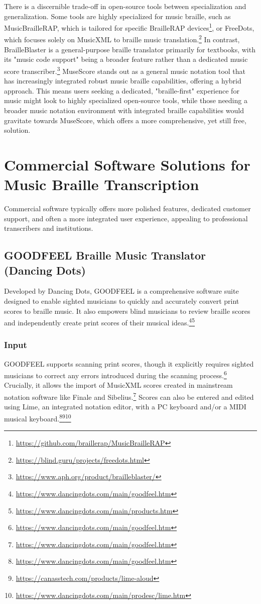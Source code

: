 There is a discernible trade-off in open-source tools between specialization and generalization. Some tools are highly specialized for music braille, such as MusicBrailleRAP, which is tailored for specific BrailleRAP devices\footnote{\url{https://github.com/braillerap/MusicBrailleRAP}}, or FreeDots, which focuses solely on MusicXML to braille music translation.\footnote{\url{https://blind.guru/projects/freedots.html}} In contrast, BrailleBlaster is a general-purpose braille translator primarily for textbooks, with its "music code support" being a broader feature rather than a dedicated music score transcriber.\footnote{\url{https://www.aph.org/product/brailleblaster/}} MuseScore stands out as a general music notation tool that has increasingly integrated robust music braille capabilities, offering a hybrid approach. This means users seeking a dedicated, "braille-first" experience for music might look to highly specialized open-source tools, while those needing a broader music notation environment with integrated braille capabilities would gravitate towards MuseScore, which offers a more comprehensive, yet still free, solution.

\section{Commercial Software Solutions for Music Braille Transcription}

Commercial software typically offers more polished features, dedicated customer support, and often a more integrated user experience, appealing to professional transcribers and institutions.

\subsection{GOODFEEL Braille Music Translator (Dancing Dots)}
Developed by Dancing Dots, GOODFEEL is a comprehensive software suite designed to enable sighted musicians to quickly and accurately convert print scores to braille music. It also empowers blind musicians to review braille scores and independently create print scores of their musical ideas.\footnote{\url{https://www.dancingdots.com/main/goodfeel.htm}}\footnote{\url{https://www.dancingdots.com/main/products.htm}}

\subsubsection{Input}
GOODFEEL supports scanning print scores, though it explicitly requires sighted musicians to correct any errors introduced during the scanning process.\footnote{\url{https://www.dancingdots.com/main/goodfeel.htm}} Crucially, it allows the import of MusicXML scores created in mainstream notation software like Finale and Sibelius.\footnote{\url{https://www.dancingdots.com/main/goodfeel.htm}} Scores can also be entered and edited using Lime, an integrated notation editor, with a PC keyboard and/or a MIDI musical keyboard.\footnote{\url{https://www.dancingdots.com/main/goodfeel.htm}}\footnote{\url{https://canasstech.com/products/lime-aloud}}\footnote{\url{https://www.dancingdots.com/main/prodesc/lime.htm}}

